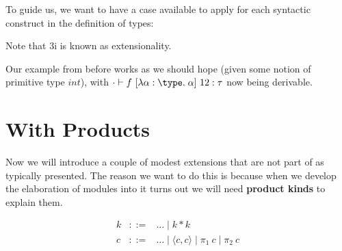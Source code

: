 \documentclass{amsart}
\begin{document}
To guide us, we want to have a case
available to apply for each syntactic construct in the definition of types:

  Note that 3i is known as extensionality. 

Our example from before works as we should hope (given some notion of primitive type $int$), with $\cdot \vdash f \ [\lambda \alpha : \type. \; \alpha] \ 12 : \tau$ now being derivable.

\section{\Fomega With Products}
Now we will introduce a couple of modest extensions that are not part of \Fomega
as typically presented. The reason we want to do this is because when we develop
the elaboration of modules into \Fomega it turns out we will need \textbf{product
  kinds} to explain them. 

  \[
  \begin{array}{lcl}
    k & ::= & \dots \mid k * k\\
    c & ::= & \dots \mid \langle c, c \rangle \mid \pi_1 \ c \mid \pi_2 \ c
  \end{array}
  \]
\end{document}
